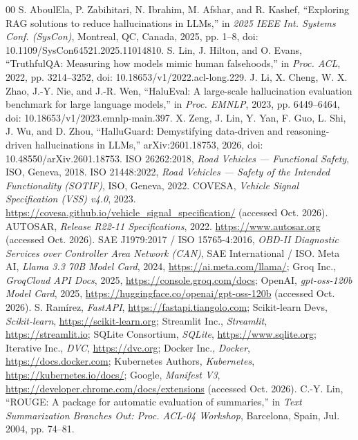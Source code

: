 \documentclass[conference,a4paper]{IEEEtran}
\begin{document}
\begin{thebibliography}{00}
 S. AboulEla, P. Zabihitari, N. Ibrahim, M. Afshar, and R. Kashef, ``Exploring RAG solutions to reduce hallucinations in LLMs,'' in \emph{2025 IEEE Int. Systems Conf. (SysCon)}, Montreal, QC, Canada, 2025, pp. 1--8, doi: 10.1109/SysCon64521.2025.11014810.
 S. Lin, J. Hilton, and O. Evans, ``TruthfulQA: Measuring how models mimic human falsehoods,'' in \emph{Proc. ACL}, 2022, pp. 3214--3252, doi: 10.18653/v1/2022.acl-long.229.
 J. Li, X. Cheng, W. X. Zhao, J.-Y. Nie, and J.-R. Wen, ``HaluEval: A large-scale hallucination evaluation benchmark for large language models,'' in \emph{Proc. EMNLP}, 2023, pp. 6449--6464, doi: 10.18653/v1/2023.emnlp-main.397.
 X. Zeng, J. Lin, Y. Yan, F. Guo, L. Shi, J. Wu, and D. Zhou, ``HalluGuard: Demystifying data-driven and reasoning-driven hallucinations in LLMs,'' arXiv:2601.18753, 2026, doi: 10.48550/arXiv.2601.18753.
 ISO 26262:2018, \emph{Road Vehicles --- Functional Safety}, ISO, Geneva, 2018.
 ISO 21448:2022, \emph{Road Vehicles --- Safety of the Intended Functionality (SOTIF)}, ISO, Geneva, 2022.
 COVESA, \emph{Vehicle Signal Specification (VSS) v4.0}, 2023. \url{https://covesa.github.io/vehicle_signal_specification/} (accessed Oct. 2026).
 AUTOSAR, \emph{Release R22-11 Specifications}, 2022. \url{https://www.autosar.org} (accessed Oct. 2026).
 SAE J1979:2017 / ISO 15765-4:2016, \emph{OBD-II Diagnostic Services over Controller Area Network (CAN)}, SAE International / ISO.
 Meta AI, \emph{Llama 3.3 70B Model Card}, 2024, \url{https://ai.meta.com/llama/}; Groq Inc., \emph{GroqCloud API Docs}, 2025, \url{https://console.groq.com/docs}; OpenAI, \emph{gpt-oss-120b Model Card}, 2025, \url{https://huggingface.co/openai/gpt-oss-120b} (accessed Oct. 2026).
 S. Ram\'irez, \emph{FastAPI}, \url{https://fastapi.tiangolo.com}; Scikit-learn Devs, \emph{Scikit-learn}, \url{https://scikit-learn.org}; Streamlit Inc., \emph{Streamlit}, \url{https://streamlit.io}; SQLite Consortium, \emph{SQLite}, \url{https://www.sqlite.org}; Iterative Inc., \emph{DVC}, \url{https://dvc.org}; Docker Inc., \emph{Docker}, \url{https://docs.docker.com}; Kubernetes Authors, \emph{Kubernetes}, \url{https://kubernetes.io/docs/}; Google, \emph{Manifest V3}, \url{https://developer.chrome.com/docs/extensions} (accessed Oct. 2026).
 C.-Y. Lin, ``ROUGE: A package for automatic evaluation of summaries,'' in \emph{Text Summarization Branches Out: Proc. ACL-04 Workshop}, Barcelona, Spain, Jul. 2004, pp. 74--81.
\end{thebibliography}
\end{document}
